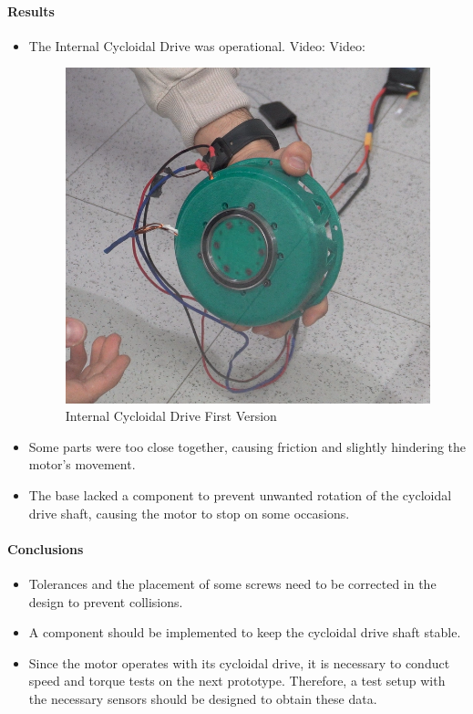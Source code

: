 \documentclass{article}
\begin{document}
\paragraph[short]{Results}
\begin{itemize}
    \item The Internal Cycloidal Drive was operational.
    Video: Video: 
    \begin{figure}[H]
        \centering
        \includegraphics[width=\linewidth]{Images/Motor/IntCycV1Still.png}
        \caption{Internal Cycloidal Drive First Version}
    \end{figure}
    \item Some parts were too close together, causing friction and slightly hindering the motor's movement.
    \item The base lacked a component to prevent unwanted rotation of the cycloidal drive shaft, causing the motor to stop on some occasions.
\end{itemize}

\paragraph[short]{Conclusions}
\begin{itemize}
    \item Tolerances and the placement of some screws need to be corrected in the design to prevent collisions.
    \item A component should be implemented to keep the cycloidal drive shaft stable.
    \item Since the motor operates with its cycloidal drive, it is necessary to conduct speed and torque tests on the next prototype. Therefore, a test setup with the necessary sensors should be designed to obtain these data.
\end{itemize}
\end{document}

